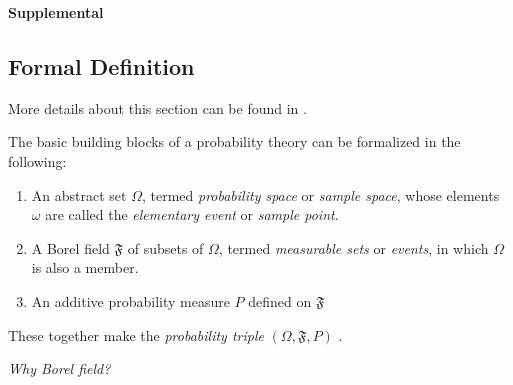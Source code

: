 \documentclass{article}
\begin{document}




\clearpage
\begin{center}
\textbf{\Large Supplemental}
\end{center}


\setcounter{equation}{0}
\setcounter{figure}{0}
\setcounter{table}{0}
\setcounter{page}{1}
\setcounter{section}{0}
\makeatletter
\renewcommand{\theequation}{S\arabic{equation}}
\renewcommand{\thefigure}{S\arabic{figure}}
\subsection*{Formal Definition}
More details about this section can be found in \cite{Chung1960}. 

The basic building blocks of a probability theory can be formalized in the following:
\begin{enumerate}
    \item An abstract set $\Omega$, termed \textit{probability space} or \textit{sample space}, whose elements $\omega$ are called the \textit{elementary event} or \textit{sample point}.
    
    \item A Borel field $\mathfrak{F}$ of subsets of $\Omega$, termed \textit{measurable sets} or \textit{events}, in which $\Omega$ is also a member.
    
    \item An additive probability measure $P$ defined on $\mathfrak{F}$
\end{enumerate}
These together make the \textit{probability triple} $(\Omega, \mathfrak{F}, P)$ . 



\textit{Why Borel field?}
\end{document}

